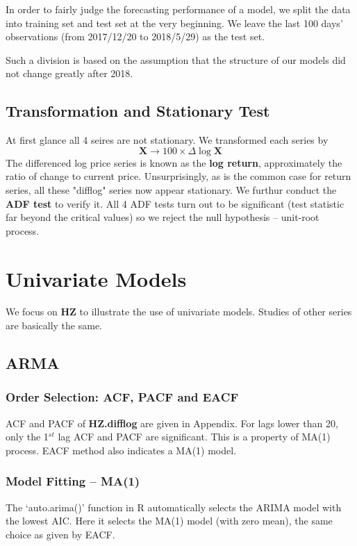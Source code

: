 \documentclass[aps,pre,12pt,preprint,onecolumn,showpacs,showkeys]{revtex4-1}
\begin{document}
    In order to fairly judge the forecasting performance of a model, we split the data into training set and test set at the very beginning. We leave the last 100 days' observations (from 2017/12/20 to 2018/5/29) as the test set. 

    Such a division is based on the assumption that the structure of our models did not change greatly after 2018.

    \subsection{Transformation and Stationary Test}

At first glance all 4 seires are not stationary. We transformed each series by
\begin{equation}
    \bm{X} \to 100 \times \Delta \log \bm{X}
\end{equation}
The differenced log price series is known as the \textbf{log return}, approximately the ratio of change to current price. Unsurprisingly, as is the common case for return series, all these "difflog" series now appear stationary. We furthur conduct the \textbf{ADF test} to verify it. All 4 ADF tests turn out to be significant (test statistic far beyond the critical values) so we reject the null hypothesis -- unit-root process. 

\section{Univariate Models}
We focus on \textbf{HZ} to illustrate the use of univariate models. Studies of other series are basically the same.
    \subsection{ARMA}
        \subsubsection{Order Selection: ACF, PACF and EACF}
        ACF and PACF of \textbf{HZ.difflog} are given in Appendix. For lags lower than 20, only the 1$^{st}$ lag ACF and PACF are significant. This is a property of MA(1) process. EACF method also indicates a MA(1) model.

        \subsubsection{Model Fitting -- MA(1)}
        The `auto.arima()' function in R automatically selects the ARIMA model with the lowest AIC. Here it selects the MA(1) model (with zero mean), the same choice as given by EACF.
\end{document}
